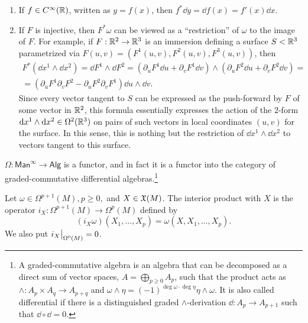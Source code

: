 \begin{example}
    \begin{enumerate}
        \item If $f\in C^\infty(\mathbb{R})$, written as $y=f(x)$, then $f^\ast \dd y=\dd f(x)=f'(x)\dd x$.
        \item If $F$ is injective, then $F^\ast\omega$ can be viewed as a ``restriction'' of $\omega$ to the image of $F$. For example, if $F:\mathbb{R}^2\to \mathbb{R}^3$ is an immersion defining a surface $S<\mathbb{R}^3$ parametrized via $F(u,v)=(F^1(u,v),F^2(u,v),F^3(u,v))$, then 
        \begin{multline}
            F^\ast(\dd x^1\wedge\dd x^2)=\dd F^1\wedge\dd F^2=(\partial_u F^1\dd u+\partial_v F^1\dd v)\wedge(\partial_u F^2\dd u+\partial_v F^2\dd v)=\\=(\partial_u F^1\partial_vF^2-\partial_uF^2\partial_vF^1)\dd u\wedge\dd v.
        \end{multline}
        Since every vector tangent to $S$ can be expressed as the push-forward by $F$ of some vector in $\mathbb{R}^2$, this formula essentially expresses the action of the $2$-form ${\mathrm{d}} x^1\wedge{\mathrm{d}} x^2\in\Omega^2(\mathbb{R}^3)$ on pairs of such vectors in local coordinates $(u,v)$ for the surface. In this sense, this is nothing but the restriction of  $\dd x^1\wedge\dd x^2$ to vectors tangent to this surface.
    \end{enumerate}
\end{example}


\begin{cor}
    $\Omega:\mathsf{Man}^\infty \to\mathsf{Alg}$ is a functor, and in fact it is a functor into the category of graded-commutative differential algebras.\footnote{A graded-commutative algebra is an algebra that can be decomposed as a direct sum of vector spaces, $A=\bigoplus_{p\geq 0}A_p $, such that the product acts as $\wedge:A_p\times A_q\to A_{p+q}$ and $\omega\wedge\eta=(-1)^{\deg\omega\cdot\deg\eta}\eta\wedge\omega$. It is also called differential if there is a distinguished graded $\wedge$-derivation $\dd:A_p\to A_{p+1}$ such that $\dd\circ \dd=0$.}
\end{cor}

\begin{defn}
    Let $\omega\in\Omega^{p+1}(M), p\geq 0,$ and $X\in\mathfrak{X}(M)$. The interior product with $X$ is the operator $i_X:\Omega^{p+1}(M)\to \Omega^p(M)$ defined by 
    \[(i_X \omega)(X_1,\ldots,X_p)=\omega(X,X_1,\ldots,X_p).\]
    We also put $\restr{i_X}{\Omega^0(M)}=0$.
\end{defn}


